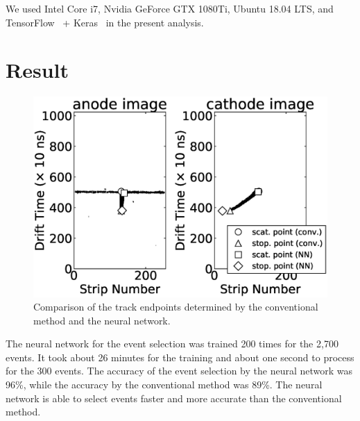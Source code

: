 \documentclass{jps-cp}
\begin{document}
We used Intel Core i7, Nvidia GeForce GTX 1080Ti, Ubuntu 18.04 LTS, and
TensorFlow~\cite{tensorflow} + Keras~\cite{keras} in the present analysis.

\section{Result}
\begin{figure}
  \vspace{-6zw}
  \centering
  \includegraphics[clip, width=25zw]{eps/compare_mono_v2.eps}
  \caption{Comparison of the track endpoints determined by the conventional method and the neural network.}
  \label{fig:result_detection}
  \vspace{-2zw}
\end{figure}

The neural network for the event selection was trained 200 times for the 2,700 events.
It took about 26 minutes for the training and about one second to process for the 300 events.
The accuracy of the event selection by the neural network was 96\%,
while the accuracy by the conventional method was 89\%.
The neural network is able to select events faster and more accurate than the conventional method.

\end{document}
